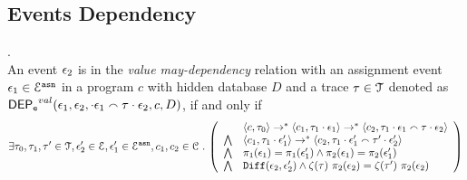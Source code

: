 %
%
%
\subsection{Events Dependency}
%
%
%
\begin{defn}
\label{def:event_valdep}.
\\
An event $\mathtt{\epsilon}_2$ is in the \emph{value may-dependency} relation with an assignment
event $\mathtt{\epsilon}_1 \in \mathcal{E}^{\mathtt{{asn}}}$ in a program ${c}$
with hidden database $D$ and a trace $\mathtt{\tau} \in \mathcal{T}$ denoted as 
%
$\mathsf{DEP_{\mathtt{e}}}^{val}(\mathtt{\epsilon}_1, \mathtt{\epsilon}_2, \cdot \mathtt{\epsilon}_1 \smallfrown \mathtt{\tau} \cdot \mathtt{\epsilon}_2, c, D)$, if and only if
%
\[
\exists \vtrace_0,
\vtrace_1, \vtrace' \in \mathcal{T}, \event_2' \in \eventset, \event_1' \in \eventset^{\asn}, {c}_1, {c}_2  \in \cdom  \st
  \left(
  \begin{array}{ll}   
 & \config{{c}, \vtrace_0} \rightarrow^{*} 
\config{{c}_1, \vtrace_1 \cdot \event_1}  \rightarrow^{*} 
  \config{{c}_2,  \vtrace_1 \cdot \event_1 \tracecat \vtrace \cdot \event_2 } 
 \\ 
 \bigwedge &
  \config{{c}_1, \vtrace_1 \cdot \event_1'}  \rightarrow^{*} 
  \config{{c}_2,  \vtrace_1 \cdot \event_1' \tracecat \vtrace' \cdot \event_2' } 
\\
\bigwedge &  \pi_1(\event_1) = \pi_1(\event_1') \land \pi_2(\event_1) = \pi_2(\event_1') 
\\
\bigwedge & 
\diff(\event_2,\event_2' ) \land 
\vcounter(\vtrace) ~ \pi_2(\event_2)
= 
\vcounter(\vtrace') ~ \pi_2(\event_2)\\
\end{array}
\right)
 \]
%
\end{defn}
